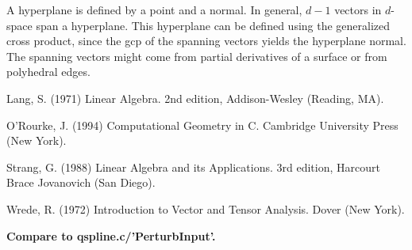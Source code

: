 \documentclass[10pt]{article}
\begin{document}
A hyperplane is defined by a point and a normal.
In general, $d-1$ vectors in $d$-space span a hyperplane.
This hyperplane can be defined using the generalized cross product,
since the gcp of the spanning vectors yields the hyperplane normal.
The spanning vectors might come from partial derivatives of a surface
or from polyhedral edges.


\begin{thebibliography}{99}

Lang, S. (1971) Linear Algebra.
2nd edition, Addison-Wesley (Reading, MA).

O'Rourke, J. (1994)
Computational Geometry in C.
Cambridge University Press (New York).

Strang, G. (1988) Linear Algebra and its Applications.
3rd edition, Harcourt Brace Jovanovich (San Diego).

Wrede, R. (1972) Introduction to Vector and Tensor Analysis.
Dover (New York).

\end{thebibliography}

{\bf Compare to qspline.c/'PerturbInput'.}
\end{document}
